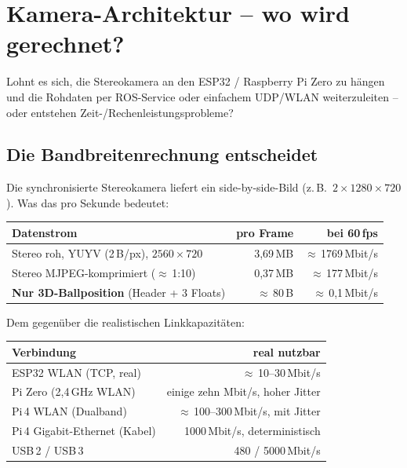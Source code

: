 
\chapter{Kamera-Architektur -- wo wird gerechnet?}

Lohnt es sich, die Stereokamera an den ESP32 / Raspberry Pi Zero zu hängen und
die Rohdaten per ROS-Service oder einfachem UDP/WLAN weiterzuleiten -- oder
entstehen Zeit-/Rechenleistungsprobleme?

\section{Die Bandbreitenrechnung entscheidet}
Die synchronisierte Stereokamera liefert ein side-by-side-Bild
(z.\,B.\ $2\times1280\times720$). Was das pro Sekunde bedeutet:
\begin{longtable}{@{}p{6.2cm}rr@{}}
\toprule
\textbf{Datenstrom} & \textbf{pro Frame} & \textbf{bei 60\,fps} \\
\midrule
Stereo roh, YUYV (2\,B/px), $2560\times720$ & 3{,}69\,MB & $\approx$\,1769\,Mbit/s \\
Stereo MJPEG-komprimiert ($\approx$\,1:10)   & 0{,}37\,MB & $\approx$\,177\,Mbit/s \\
\textbf{Nur 3D-Ballposition} (Header + 3 Floats) & $\approx$\,80\,B & $\approx$\,0{,}1\,Mbit/s \\
\bottomrule
\end{longtable}
\noindent Dem gegenüber die realistischen Linkkapazitäten:
\begin{longtable}{@{}p{6.2cm}r@{}}
\toprule
\textbf{Verbindung} & \textbf{real nutzbar} \\
\midrule
ESP32 WLAN (TCP, real)         & $\approx$\,10--30\,Mbit/s \\
Pi Zero (2{,}4\,GHz WLAN)     & einige zehn Mbit/s, hoher Jitter \\
Pi\,4 WLAN (Dualband)          & $\approx$\,100--300\,Mbit/s, mit Jitter \\
Pi\,4 Gigabit-Ethernet (Kabel) & 1000\,Mbit/s, deterministisch \\
USB\,2 / USB\,3               & 480 / 5000\,Mbit/s \\
\bottomrule
\end{longtable}

